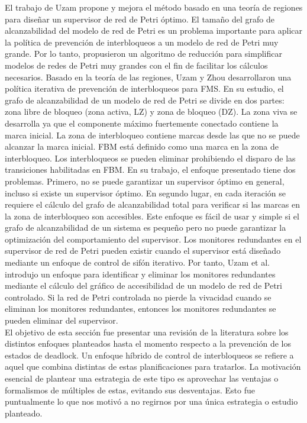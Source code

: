 \par El trabajo de Uzam \cite{uzam2004, uzam2002} propone y mejora el método basado en una teoría de regiones para diseñar un supervisor de red de Petri óptimo. El tamaño del grafo de alcanzabilidad del modelo de red de Petri es un problema importante para aplicar la política de prevención de interbloqueos a un modelo de red de Petri muy grande. Por lo tanto, propusieron un algoritmo de reducción para simplificar modelos de redes de Petri muy grandes con el fin de facilitar los cálculos necesarios. Basado en la teoría de las regiones, Uzam y Zhou \cite{uzamandzhou2004} desarrollaron una política iterativa de prevención de interbloqueos para FMS. En su estudio, el grafo de alcanzabilidad de un modelo de red de Petri se divide en dos partes: zona libre de bloqueo (zona activa, LZ) y zona de bloqueo (DZ). La zona viva se desarrolla ya que el componente máximo fuertemente conectado contiene la marca inicial. La zona de interbloqueo contiene marcas desde las que no se puede alcanzar la marca inicial. FBM está definido como una marca en la zona de interbloqueo. Los interbloqueos se pueden eliminar prohibiendo el disparo de las transiciones habilitadas en FBM. En su trabajo, el enfoque presentado tiene dos problemas. Primero, no se puede garantizar un supervisor óptimo en general, incluso si existe un supervisor óptimo. En segundo lugar, en cada iteración se requiere el cálculo del grafo de alcanzabilidad total para verificar si las marcas en la zona de interbloqueo son accesibles. Este enfoque es fácil de usar y simple si el grafo de alcanzabilidad de un sistema es pequeño pero no puede garantizar la optimización del comportamiento del supervisor. Los monitores redundantes en el supervisor de red de Petri pueden existir cuando el supervisor está diseñado mediante un enfoque de control de sifón iterativo. Por tanto, Uzam et al. \cite{uzammuratli2007} introdujo un enfoque para identificar y eliminar los monitores redundantes mediante el cálculo del gráfico de accesibilidad de un modelo de red de Petri controlado. Si la red de Petri controlada no pierde la vivacidad cuando se eliminan los monitores redundantes, entonces los monitores redundantes se pueden eliminar del supervisor.\\

El objetivo de esta sección fue presentar una revisión de la literatura sobre los distintos enfoques planteados hasta el momento respecto a la prevención de los estados de deadlock.
Un enfoque híbrido de control de interbloqueos se refiere a aquel que combina distintas de estas planificaciones para tratarlos. La motivación esencial de plantear una estrategia de este tipo es aprovechar las ventajas o formalismos de múltiples de estas, evitando sus desventajas. Esto fue puntualmente lo que nos motivó a no regirnos por una única estrategia o estudio planteado.


